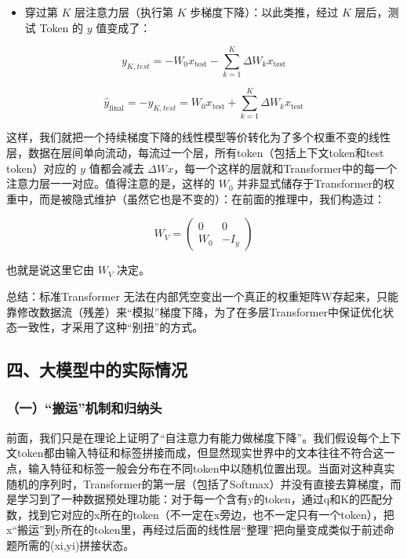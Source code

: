 \begin{itemize}
\tightlist
\item
{}
  穿过第 \(K\) 层注意力层（执行第 \(K\) 步梯度下降）：以此类推，经过 \(K\) 层后，测试 Token 的 \(y\) 值变成了：
\end{itemize}

\[
y_{K,test}=-W_0x_{\mathrm{test}}-\sum_{k=1}^{K}\Delta W_k x_{\mathrm{test}}
\]

\[
\hat{y}_{\mathrm{final}}=-y_{K,test}=W_0x_{\mathrm{test}}+\sum_{k=1}^{K}\Delta W_k x_{\mathrm{test}}
\]

这样，我们就把一个持续梯度下降的线性模型等价转化为了多个权重不变的线性层，数据在层间单向流动，每流过一个层，所有token（包括上下文token和test token）对应的 \(y\) 值都会减去 \(\Delta Wx\)，每一个这样的层就和Transformer中的每一个注意力层一一对应。值得注意的是，这样的 \(W_0\) 并非显式储存于Transformer的权重中，而是被隐式维护（虽然它也是不变的）：在前面的推理中，我们构造过：

\[
W_V=\begin{pmatrix}0&0\\W_0&-I_y\end{pmatrix}
\]

也就是说这里它由 \(W_V\) 决定。

总结：标准Transformer 无法在内部凭空变出一个真正的权重矩阵W存起来，只能靠修改数据流（残差）来``模拟''梯度下降，为了在多层Transformer中保证优化状态一致性，才采用了这种``别扭''的方式。

\hypertarget{ux56dbux5927ux6a21ux578bux4e2dux7684ux5b9eux9645ux60c5ux51b5}{%
\subsection{四、大模型中的实际情况}\label{ux56dbux5927ux6a21ux578bux4e2dux7684ux5b9eux9645ux60c5ux51b5}}

\hypertarget{ux4e00ux642cux8fd0ux673aux5236ux548cux5f52ux7eb3ux5934}{%
\subsubsection{（一）``搬运''机制和归纳头}\label{ux4e00ux642cux8fd0ux673aux5236ux548cux5f52ux7eb3ux5934}}

前面，我们只是在理论上证明了``自注意力有能力做梯度下降''。我们假设每个上下文token都由输入特征和标签拼接而成，但显然现实世界中的文本往往不符合这一点，输入特征和标签一般会分布在不同token中以随机位置出现。当面对这种真实随机的序列时，Transformer的第一层（包括了Softmax）并没有直接去算梯度，而是学习到了一种数据预处理功能：对于每一个含有y的token，通过q和K的匹配分数，找到它对应的x所在的token（不一定在x旁边，也不一定只有一个token），把x``搬运''到y所在的token里，再经过后面的线性层``整理''把向量变成类似于前述命题所需的(xi,yi)拼接状态。

